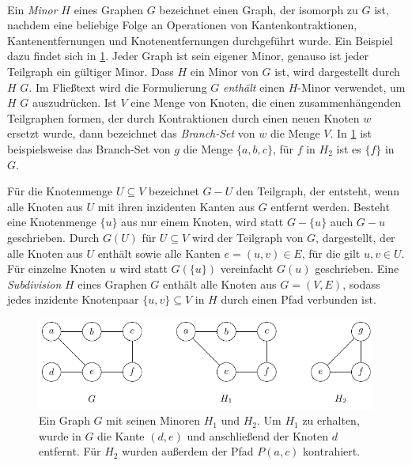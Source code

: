 \ \\

Ein \emph{Minor} $H$ eines Graphen $G$ bezeichnet einen Graph, der isomorph zu $G$ ist, nachdem eine beliebige Folge an Operationen von Kantenkontraktionen, Kantenentfernungen und Knotenentfernungen durchgeführt wurde.
Ein Beispiel dazu findet sich in \Abb \ref{fig:Minor}.
Jeder Graph ist sein eigener Minor, genauso ist jeder Teilgraph ein gültiger Minor.
Dass $H$ ein Minor von $G$ ist, wird dargestellt durch $H$ \minor $G$.
Im Fließtext wird die Formulierung $G$ \emph{enthält} einen $H$-Minor verwendet, um $H$ \minor $G$ auszudrücken.
Ist $V$ eine Menge von Knoten, die einen zusammenhängenden Teilgraphen formen, der durch Kontraktionen durch einen neuen Knoten $w$ ersetzt wurde, dann bezeichnet das \emph{Branch-Set} von $w$ die Menge $V$.
In \Abb \ref{fig:Minor} ist beispielsweise das Branch-Set von $g$ die Menge $\{a, b, c\}$, für $f$ in $H_2$ ist es $\{f\}$ in $G$.

Für die Knotenmenge $U \subseteq V$ bezeichnet $G - U$ den Teilgraph, der entsteht, wenn alle Knoten aus $U$ mit ihren inzidenten Kanten aus $G$ entfernt werden.
Besteht eine Knotenmenge $\{u\}$ aus nur einem Knoten, wird statt $G - \{u\}$ auch $G - u$ geschrieben.
Durch $G(U)$ für $U \subseteq V$ wird der Teilgraph von $G$, dargestellt, der alle Knoten aus $U$ enthält sowie alle Kanten $e = (u, v) \in E$, für die gilt $u, v \in U$.
Für einzelne Knoten $u$ wird statt $G(\{u\})$ vereinfacht $G(u)$ geschrieben.
Eine \emph{Subdivision} $H$ eines Graphen $G$ enthält alle Knoten aus $G = (V, E)$, sodass jedes inzidente Knotenpaar $\{u, v\} \subseteq V$ in $H$ durch einen Pfad verbunden ist.
\begin{figure}[H]
  \centering
  \includegraphics[keepaspectratio]{bilder/Minor.pdf}
  \caption{Ein Graph $G$ mit seinen Minoren $H_1$ und $H_2$.
           Um $H_1$ zu erhalten, wurde in $G$ die Kante $(d, e)$ und anschließend der Knoten $d$ entfernt.
           Für $H_2$ wurden außerdem der Pfad $P(a, c)$ kontrahiert.}
  \label{fig:Minor}
\end{figure}

